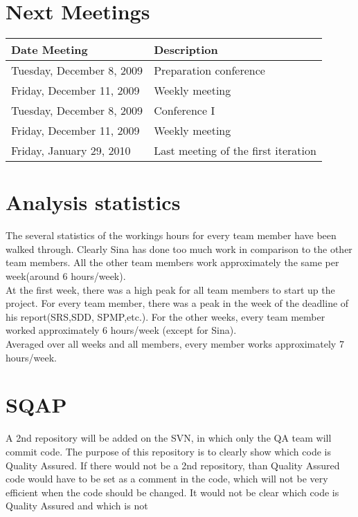 \documentclass[a4paper, 12pt]{article}
\begin{document}
	\section{Next Meetings}
			\begin{tabular}{l | l }
				\textbf{Date Meeting} & \textbf{Description} \\
				\hline
				Tuesday, December 8, 2009 & Preparation conference \\
				Friday, December 11, 2009 & Weekly meeting \\
				Tuesday, December 8, 2009 & Conference I \\
				Friday, December 11, 2009 & Weekly meeting \\
				Friday, January 29, 2010 & Last meeting of the first iteration \\
			\end{tabular}	
	\section{Analysis statistics}
		The several statistics of the workings hours for every team member have been walked through. Clearly Sina has done too much work in comparison to the other team members. All the other team members work approximately the same per week(around 6 hours/week). \\
		At the first week, there was a high peak for all team members to start up the project. For every team member, there was a peak in the week of the deadline of his report(SRS,SDD, SPMP,etc.). For the other weeks, every team member worked approximately 6 hours/week (except for Sina). \\ Averaged over all weeks and all members, every member works approximately 7 hours/week. 
		

	\section{SQAP}
A 2nd repository will be added on the SVN, in which only the QA team will commit code. The purpose of this repository is to clearly show which code is Quality Assured. If there would not be a 2nd repository, than Quality Assured code would have to be set as a comment in the code, which will not be very efficient when the code should be changed. It would not be clear which code is Quality Assured and which is not
\end{document}

